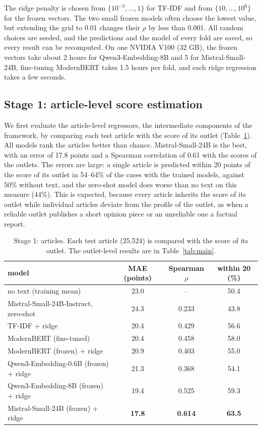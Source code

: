 \documentclass[11pt,a4paper]{article}
\begin{document}
The ridge penalty is chosen from $\{10^{-3}, \ldots, 1\}$ for TF-IDF and from $\{10, \ldots, 10^6\}$ for the frozen
vectors. The two small frozen models often choose the lowest value, but extending the grid to 0.01 changes their $\rho$
by less than 0.001. All random choices are seeded, and the predictions and the model of every fold are saved, so every
result can be recomputed. On one NVIDIA V100 (32 GB), the frozen vectors take about 2 hours for Qwen3-Embedding-8B and 5
for Mistral-Small-24B, fine-tuning ModernBERT takes 1.5 hours per fold, and each ridge regression takes a few seconds.

\subsection{Stage 1: article-level score estimation}\label{sec:stage1}
We first evaluate the article-level regressors, the intermediate components of the framework, by comparing each test
article with the score of its outlet (Table~\ref{tab:article}). All models rank the articles better than chance.
Mistral-Small-24B is the best, with an error of 17.8 points and a Spearman correlation of 0.61 with the scores of the
outlets. The errors are large: a single article is predicted within 20 points of the score of its outlet in 54--64\% of
the cases with the trained models, against 50\% without text, and the zero-shot model does worse than no text on this
measure (44\%). This is expected, because every article inherits the score of its outlet while individual articles
deviate from the profile of the outlet, as when a reliable outlet publishes a short opinion piece or an unreliable one a
factual report.

\begin{table}[t]
\centering
\caption{Stage 1: articles. Each test article (25,524) is compared with the score of its outlet. The outlet-level
results are in Table~\ref{tab:main}.}\label{tab:article}
\begin{tabular}{lccc}
\toprule
model & MAE (points) & Spearman $\rho$ & within 20 (\%) \\
\midrule
no text (training mean) & 23.0 & -- & 50.4 \\
Mistral-Small-24B-Instruct, zero-shot & 24.3 & 0.233 & 43.8 \\
\midrule
TF-IDF + ridge & 20.4 & 0.429 & 56.6 \\
ModernBERT (fine-tuned) & 20.4 & 0.458 & 58.0 \\
ModernBERT (frozen) + ridge & 20.9 & 0.403 & 55.0 \\
Qwen3-Embedding-0.6B (frozen) + ridge & 21.3 & 0.368 & 54.1 \\
Qwen3-Embedding-8B (frozen) + ridge & 19.4 & 0.525 & 59.3 \\
Mistral-Small-24B (frozen) + ridge & \textbf{17.8} & \textbf{0.614} & \textbf{63.5} \\
\bottomrule
\end{tabular}
\end{table}
\end{document}
